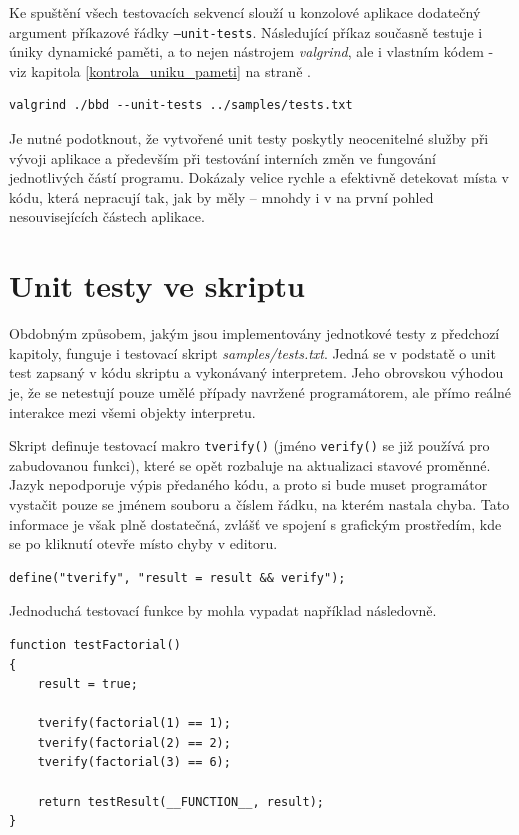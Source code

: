 \documentclass[11pt,twoside,a4paper]{book}
\begin{document}
Ke spuštění všech testovacích sekvencí slouží u konzolové aplikace dodatečný argument pří\-ka\-zo\-vé řádky \texttt{--unit-tests}. Následující příkaz současně testuje i úniky dynamické paměti, a to nejen nástrojem \textit{valgrind}, ale i vlastním kódem - viz kapitola \ref{kontrola_uniku_pameti} na straně \pageref{kontrola_uniku_pameti}.

\begin{verbatim}
valgrind ./bbd --unit-tests ../samples/tests.txt
\end{verbatim}

Je nutné podotknout, že vytvořené unit testy poskytly neocenitelné služby při vývoji aplikace a především při testování interních změn ve fungování jednotlivých částí programu. Dokázaly velice rychle a efektivně detekovat místa v kódu, která nepracují tak, jak by měly -- mnohdy i v na první pohled nesouvisejících částech aplikace.


\section{Unit testy ve skriptu}

Obdobným způsobem, jakým jsou implementovány jednotkové testy z předchozí kapitoly, funguje i testovací skript \textit{samples/tests.txt}. Jedná se v podstatě o unit test zapsaný v kódu skriptu a vykonávaný interpretem. Jeho obrovskou výhodou je, že se netestují pouze umělé případy navržené programátorem, ale přímo reálné interakce mezi všemi objekty interpretu.

Skript definuje testovací makro \texttt{tverify()} (jméno \texttt{verify()} se již používá pro zabudovanou funkci), které se opět rozbaluje na aktualizaci stavové proměnné. Jazyk nepodporuje výpis předaného kódu, a proto si bude muset programátor vystačit pouze se jménem souboru a číslem řádku, na kterém nastala chyba. Tato informace je však plně dostatečná, zvlášť ve spojení s grafickým prostředím, kde se po kliknutí otevře místo chyby v editoru.

\begin{verbatim}
define("tverify", "result = result && verify");
\end{verbatim}

Jednoduchá testovací funkce by mohla vypadat například následovně.

\begin{verbatim}
function testFactorial()
{
    result = true;

    tverify(factorial(1) == 1);
    tverify(factorial(2) == 2);
    tverify(factorial(3) == 6);

    return testResult(__FUNCTION__, result);
}
\end{verbatim}
\end{document}
